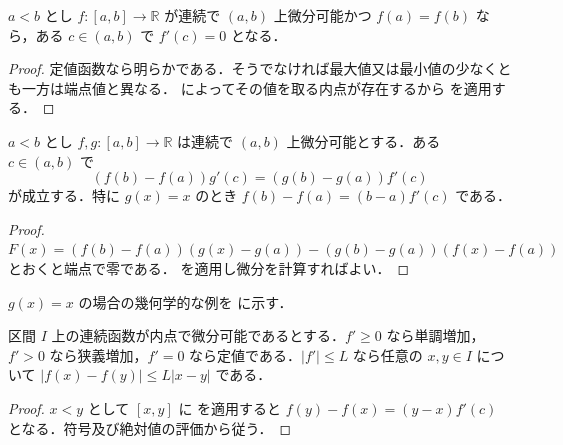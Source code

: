 \begin{prop}[Rolleの定理]
$a<b$ とし $f:[a,b]\to\mathbb R$ が連続で $(a,b)$ 上微分可能かつ $f(a)=f(b)$ なら，ある $c\in(a,b)$ で $f'(c)=0$ となる．
\end{prop}
\begin{proof}
定値函数なら明らかである．そうでなければ最大値又は最小値の少なくとも一方は端点値と異なる． によってその値を取る内点が存在するから  を適用する．
\end{proof}
\begin{prop}[Cauchyの平均値定理]
$a<b$ とし $f,g:[a,b]\to\mathbb R$ は連続で $(a,b)$ 上微分可能とする．ある $c\in(a,b)$ で
\[
(f(b)-f(a))g'(c)=(g(b)-g(a))f'(c)
\]
が成立する．特に $g(x)=x$ のとき $f(b)-f(a)=(b-a)f'(c)$ である．
\end{prop}
\begin{proof}
$F(x)=(f(b)-f(a))(g(x)-g(a))-(g(b)-g(a))(f(x)-f(a))$ とおくと端点で零である． を適用し微分を計算すればよい．
\end{proof}
$g(x)=x$ の場合の幾何学的な例を  に示す．
\begin{prop}[微分係数による単調性と評価]
区間 $I$ 上の連続函数が内点で微分可能であるとする．$f'\geq0$ なら単調増加，$f'>0$ なら狭義増加，$f'=0$ なら定値である．$|f'|\leq L$ なら任意の $x,y\in I$ について $|f(x)-f(y)|\leq L|x-y|$ である．
\end{prop}
\begin{proof}
$x<y$ として $[x,y]$ に  を適用すると $f(y)-f(x)=(y-x)f'(c)$ となる．符号及び絶対値の評価から従う．
\end{proof}
